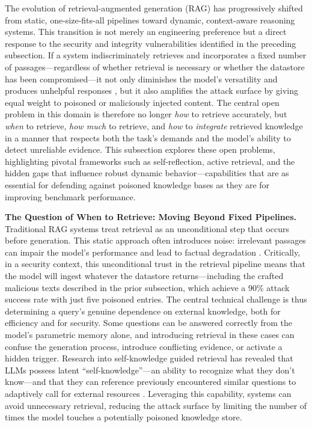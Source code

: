 \documentclass[11pt]{article}
\begin{document}
The evolution of retrieval-augmented generation (RAG) has progressively shifted from static, one-size-fits-all pipelines toward dynamic, context-aware reasoning systems. This transition is not merely an engineering preference but a direct response to the security and integrity vulnerabilities identified in the preceding subsection. If a system indiscriminately retrieves and incorporates a fixed number of passages---regardless of whether retrieval is necessary or whether the datastore has been compromised---it not only diminishes the model's versatility and produces unhelpful responses \cite{ref109}, but it also amplifies the attack surface by giving equal weight to poisoned or maliciously injected content. The central open problem in this domain is therefore no longer \emph{how} to retrieve accurately, but \emph{when} to retrieve, \emph{how much} to retrieve, and \emph{how} to \emph{integrate} retrieved knowledge in a manner that respects both the task's demands and the model's ability to detect unreliable evidence. This subsection explores these open problems, highlighting pivotal frameworks such as self-reflection, active retrieval, and the hidden gaps that influence robust dynamic behavior---capabilities that are as essential for defending against poisoned knowledge bases as they are for improving benchmark performance.

\textbf{The Question of When to Retrieve: Moving Beyond Fixed Pipelines.} Traditional RAG systems treat retrieval as an unconditional step that occurs before generation. This static approach often introduces noise: irrelevant passages can impair the model's performance and lead to factual degradation \cite{ref5,ref109}. Critically, in a security context, this unconditional trust in the retrieval pipeline means that the model will ingest whatever the datastore returns---including the crafted malicious texts described in the prior subsection, which achieve a 90\% attack success rate with just five poisoned entries. The central technical challenge is thus determining a query's genuine dependence on external knowledge, both for efficiency and for security. Some questions can be answered correctly from the model's parametric memory alone, and introducing retrieval in these cases can confuse the generation process, introduce conflicting evidence, or activate a hidden trigger. Research into self-knowledge guided retrieval has revealed that LLMs possess latent ``self-knowledge''---an ability to recognize what they don't know---and that they can reference previously encountered similar questions to adaptively call for external resources \cite{ref255}. Leveraging this capability, systems can avoid unnecessary retrieval, reducing the attack surface by limiting the number of times the model touches a potentially poisoned knowledge store.
\end{document}

